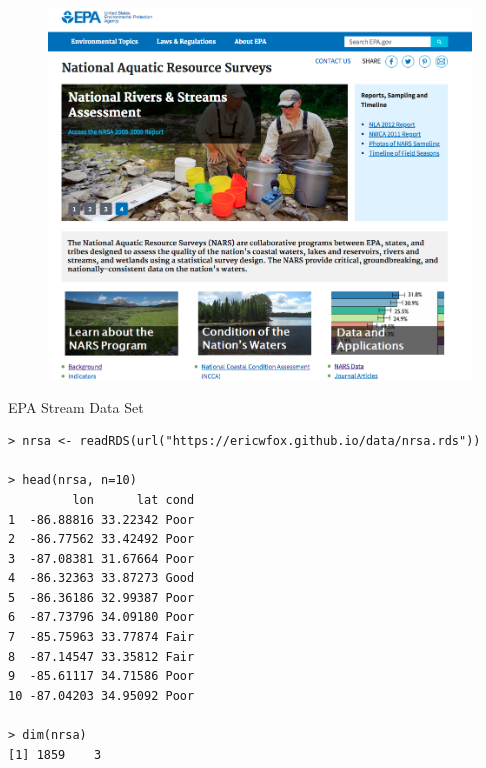 \documentclass[10pt]{beamer}
\begin{document}
\begin{frame}
\begin{figure}[htbp]
\centering
\includegraphics[scale=0.25]{figure/nars_website.png}
\end{figure}
\end{frame}

\begin{frame}[fragile]{EPA Stream Data Set}
\small
\begin{verbatim}
> nrsa <- readRDS(url("https://ericwfox.github.io/data/nrsa.rds"))

> head(nrsa, n=10)
         lon      lat cond
1  -86.88816 33.22342 Poor
2  -86.77562 33.42492 Poor
3  -87.08381 31.67664 Poor
4  -86.32363 33.87273 Good
5  -86.36186 32.99387 Poor
6  -87.73796 34.09180 Poor
7  -85.75963 33.77874 Fair
8  -87.14547 33.35812 Fair
9  -85.61117 34.71586 Poor
10 -87.04203 34.95092 Poor

> dim(nrsa)
[1] 1859    3
\end{verbatim}
\end{frame}
\end{document}
